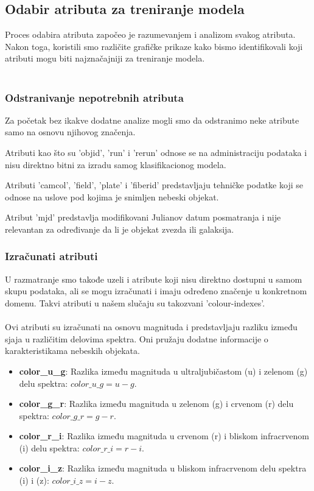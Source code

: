 \documentclass[a4paper,12pt]{article}
\begin{document}
\clearpage
\subsection{Odabir atributa za treniranje modela}

Proces odabira atributa započeo je razumevanjem i analizom svakog atributa. Nakon toga, koristili smo različite grafičke prikaze kako bismo identifikovali koji atributi mogu biti najznačajniji za treniranje modela.\\\\

\subsubsection{Odstranivanje nepotrebnih atributa}

Za početak bez ikakve dodatne analize mogli smo da odstranimo neke atribute samo na osnovu njihovog značenja.

\noindent Atributi kao što su 'objid', 'run' i 'rerun' odnose se na administraciju podataka i nisu direktno bitni za izradu samog klasifikacionog modela.

\noindent Atributi 'camcol', 'field', 'plate' i 'fiberid' predstavljaju tehničke podatke koji se odnose na uslove pod kojima je snimljen nebeski objekat.

\noindent Atribut 'mjd' predstavlja modifikovani Julianov datum posmatranja i nije relevantan za određivanje da li je objekat zvezda ili galaksija.

\subsubsection{Izračunati atributi}

U razmatranje smo takođe uzeli i atribute koji nisu direktno dostupni u samom skupu podataka, ali se mogu izračunati i imaju određeno značenje u konkretnom domenu. Takvi atributi u našem slučaju su takozvani 'colour-indexes'.
\\\\Ovi atributi su izračunati na osnovu magnituda i predstavljaju razliku između sjaja u različitim delovima spektra. Oni pružaju dodatne informacije o karakteristikama nebeskih objekata.
        \begin{itemize}
            \item \textbf{color\_u\_g}: Razlika između magnituda u ultraljubičastom (u) i zelenom (g) delu spektra: $color\_u\_g = u - g$.
            \item \textbf{color\_g\_r}: Razlika između magnituda u zelenom (g) i crvenom (r) delu spektra: $color\_g\_r = g - r$.
            \item \textbf{color\_r\_i}: Razlika između magnituda u crvenom (r) i bliskom infracrvenom (i) delu spektra: $color\_r\_i = r - i$.
            \item \textbf{color\_i\_z}: Razlika između magnituda u bliskom infracrvenom delu spektra (i) i (z): $color\_i\_z = i - z$.
        \end{itemize}
\end{document}
